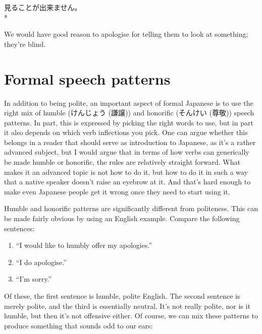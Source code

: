 \documentclass[11pt, b5paper, twoside, openright, onecolumn]{book}
\makeatletter
\newcommand*{\rubystack}[2]{{\relscale{0.5}%
  \begin{tabular}[b]{@{}c@{}}%
    {#1}\\%
   {\textscale{2}{#2}}%
  \end{tabular}}%
}
\DeclareRobustCommand*{\ruby}[2]{%
  \mbox{%
    \setlength{\parskip}{0ex}%
    \BeginAccSupp{method=pdfstringdef,ActualText={#1}}%
      \rubystack{\phantom{#2}}{#1}%
      \llap{%
        \rubystack{#2}{\phantom{#1}}%
      }%
    \EndAccSupp{}%
  }%
}
\renewcommand*{\ruby}[2]{#2 (#1)}%
\newenvironment{exampleblock}{
\setlength{\parindent}{0.6in}
\begin{minipage}[t]{\dimexpr\textwidth-\parindent}}
{\end{minipage}}
\makeatother
\begin{document}
\vspace{0.4cm}
\begin{exampleblock}
見ることが出来ません。 \\* 
\end{exampleblock}
\vspace{0.2cm}

We would have good reason to apologise for telling them to look at something; they’re blind.

\section{Formal speech patterns}

In addition to being polite‚ an important aspect of formal Japanese is to use the right mix of humble (\ruby{謙譲}{けんじょう}) and honorific (\ruby{尊敬}{そんけい}) speech patterns. In part‚ this is expressed by picking the right words to use‚ but in part it also depends on which verb inflections you pick. One can argue whether this belongs in a reader that should serve as introduction to Japanese‚ as it’s a rather advanced subject‚ but I would argue that in terms of how verbs can generically be made humble or honorific‚ the rules are relatively straight forward. What makes it an advanced topic is not how to do it‚ but how to do it in such a way that a native speaker doesn’t raise an eyebrow at it. And that’s hard enough to make even Japanese people get it wrong once they need to start using it.

Humble and honorific patterns are significantly different from politeness. This can be made fairly obvious by using an English example. Compare the following sentences:

\begin{enumerate}
\item “I would like to humbly offer my apologies.”
\item “I do apologise.”
\item “I’m sorry.”
\end{enumerate}

Of these‚ the first sentence is humble‚ polite English. The second sentence is merely polite‚ and the third is essentially neutral. It’s not really polite‚ nor is it humble‚ but then it’s not offensive either. Of course‚ we can mix these patterns to produce something that sounds odd to our ears:
\end{document}
